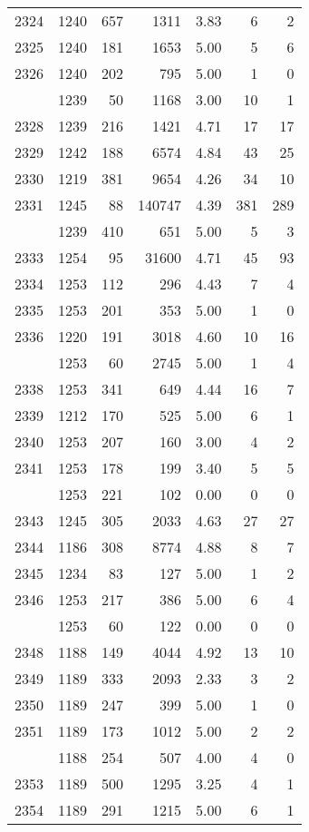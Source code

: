 \documentclass[
]{article}
\begin{document}
\begin{table}
\begin{tabular}[t]{lrrrrrr}
2324 & 1240 & 657 & 1311 & 3.83 & 6 & 2\\
2325 & 1240 & 181 & 1653 & 5.00 & 5 & 6\\
2326 & 1240 & 202 & 795 & 5.00 & 1 & 0\\
\addlinespace
2327 & 1239 & 50 & 1168 & 3.00 & 10 & 1\\
2328 & 1239 & 216 & 1421 & 4.71 & 17 & 17\\
2329 & 1242 & 188 & 6574 & 4.84 & 43 & 25\\
2330 & 1219 & 381 & 9654 & 4.26 & 34 & 10\\
2331 & 1245 & 88 & 140747 & 4.39 & 381 & 289\\
\addlinespace
2332 & 1239 & 410 & 651 & 5.00 & 5 & 3\\
2333 & 1254 & 95 & 31600 & 4.71 & 45 & 93\\
2334 & 1253 & 112 & 296 & 4.43 & 7 & 4\\
2335 & 1253 & 201 & 353 & 5.00 & 1 & 0\\
2336 & 1220 & 191 & 3018 & 4.60 & 10 & 16\\
\addlinespace
2337 & 1253 & 60 & 2745 & 5.00 & 1 & 4\\
2338 & 1253 & 341 & 649 & 4.44 & 16 & 7\\
2339 & 1212 & 170 & 525 & 5.00 & 6 & 1\\
2340 & 1253 & 207 & 160 & 3.00 & 4 & 2\\
2341 & 1253 & 178 & 199 & 3.40 & 5 & 5\\
\addlinespace
2342 & 1253 & 221 & 102 & 0.00 & 0 & 0\\
2343 & 1245 & 305 & 2033 & 4.63 & 27 & 27\\
2344 & 1186 & 308 & 8774 & 4.88 & 8 & 7\\
2345 & 1234 & 83 & 127 & 5.00 & 1 & 2\\
2346 & 1253 & 217 & 386 & 5.00 & 6 & 4\\
\addlinespace
2347 & 1253 & 60 & 122 & 0.00 & 0 & 0\\
2348 & 1188 & 149 & 4044 & 4.92 & 13 & 10\\
2349 & 1189 & 333 & 2093 & 2.33 & 3 & 2\\
2350 & 1189 & 247 & 399 & 5.00 & 1 & 0\\
2351 & 1189 & 173 & 1012 & 5.00 & 2 & 2\\
\addlinespace
2352 & 1188 & 254 & 507 & 4.00 & 4 & 0\\
2353 & 1189 & 500 & 1295 & 3.25 & 4 & 1\\
2354 & 1189 & 291 & 1215 & 5.00 & 6 & 1\\

\end{tabular}
\end{table}
\end{document}
